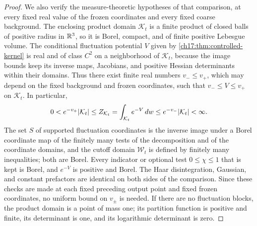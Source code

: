 \begin{proof}
We also verify the measure-theoretic hypotheses of that comparison, at every fixed real value of the frozen coordinates and every fixed coarse background. The enclosing product domain $\mathcal K_t$ is a finite product of closed balls of positive radius in $\mathbb R^3$, so it is Borel, compact, and of finite positive Lebesgue volume. The conditional fluctuation potential $V$ given by \cref{ch17:thm:controlled-kernel} is real and of class $C^2$ on a neighborhood of $\mathcal K_t$, because the image bounds keep its inverse maps, Jacobians, and positive Hessian determinants within their domains. Thus there exist finite real numbers $v_-\le v_+$, which may depend on the fixed background and frozen coordinates, such that $v_-\le V\le v_+$ on $\mathcal K_t$. In particular,
\begin{equation}\label{ch19:eq:ambient-finite-normalizer}
 0<e^{-v_+}\lvert \mathcal K_t\rvert\le Z_{\mathcal K_t}=\int_{\mathcal K_t}e^{-V}\,dw\le e^{-v_-}\lvert \mathcal K_t\rvert<\infty.
\end{equation}
The set $S$ of supported fluctuation coordinates is the inverse image under a Borel coordinate map of the finitely many tests of the decomposition and of the coordinate domains, and the cutoff domain $\mathcal W_t$ is defined by finitely many inequalities; both are Borel. Every indicator or optional test $0\le\chi\le1$ that is kept is Borel, and $e^{-V}$ is positive and Borel. The Haar disintegration, Gaussian, and constant prefactors are identical on both sides of the comparison. Since these checks are made at each fixed preceding output point and fixed frozen coordinates, no uniform bound on $v_\pm$ is needed. If there are no fluctuation blocks, the product domain is a point of mass one; its partition function is positive and finite, its determinant is one, and its logarithmic determinant is zero.


\end{proof}
